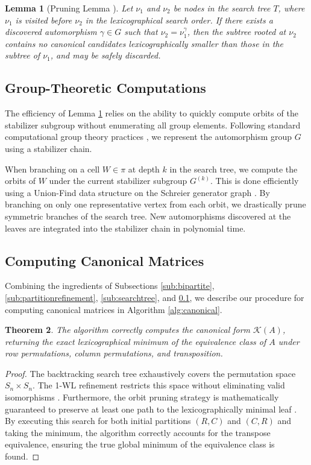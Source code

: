 \documentclass[reqno]{amsart}
\numberwithin{equation}{section}
\newtheorem{theorem}{Theorem}[section]
\newtheorem{lemma}[theorem]{Lemma}
\begin{document}
\begin{lemma}[Pruning Lemma \cite{McKay2014}]\label{lem:pruning-lemma}
Let $\nu_1$ and $\nu_2$ be nodes in the search tree $T$, where $\nu_1$ is visited before $\nu_2$ in the lexicographical search order. If there exists a discovered automorphism $\gamma \in G$ such that $\nu_2 = \nu_1^\gamma$, then the subtree rooted at $\nu_2$ contains no canonical candidates lexicographically smaller than those in the subtree of $\nu_1$, and may be safely discarded.
\end{lemma}

\subsection{Group-Theoretic Computations}\label{sub:group}

The efficiency of Lemma \ref{lem:pruning-lemma} relies on the ability to quickly compute orbits of the stabilizer subgroup without enumerating all group elements. Following standard computational group theory practices \cite{dixon1996permutation}, we represent the automorphism group $G$ using a stabilizer chain. 

When branching on a cell $W \in \pi$ at depth $k$ in the search tree, we compute the orbits of $W$ under the current stabilizer subgroup $G^{(k)}$. This is done efficiently using a Union-Find data structure on the Schreier generator graph \cite[Section 3.6]{dixon1996permutation}. By branching on only one representative vertex from each orbit, we drastically prune symmetric branches of the search tree. New automorphisms discovered at the leaves are integrated into the stabilizer chain in polynomial time.




\subsection{Computing Canonical Matrices}

Combining the ingredients of Subsections \ref{sub:bipartite}, \ref{sub:partitionrefinement}, \ref{sub:searchtree}, and \ref{sub:group}, we describe our procedure for computing canonical matrices in Algorithm \ref{alg:canonical}.

\begin{theorem}
The algorithm correctly computes the canonical form $\mathcal{K}(A)$, returning the exact lexicographical minimum of the equivalence class of $A$ under row permutations, column permutations, and transposition.
\end{theorem}
\begin{proof}
The backtracking search tree exhaustively covers the permutation space $S_n \times S_n$. The 1-WL refinement restricts this space without eliminating valid isomorphisms \cite{McKay1981}. Furthermore, the orbit pruning strategy is mathematically guaranteed to preserve at least one path to the lexicographically minimal leaf \cite[Theorem 2.15]{McKay2014}. By executing this search for both initial partitions $(R, C)$ and $(C, R)$ and taking the minimum, the algorithm correctly accounts for the transpose equivalence, ensuring the true global minimum of the equivalence class is found.
\end{proof}
\end{document}
